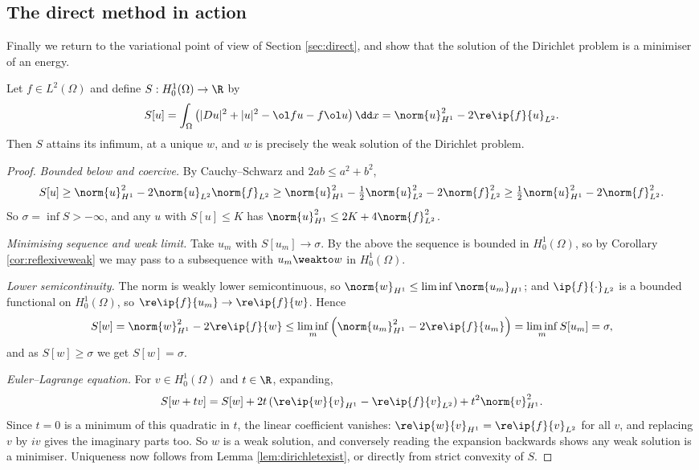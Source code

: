 \subsection{The direct method in action}

Finally we return to the variational point of view of Section \ref{sec:direct}, and show that the solution of the Dirichlet problem is a minimiser of an energy.

\begin{proposition}\label{prop:dirichletmin}
	Let $f \in L^2(\Omega)$ and define $S : H_0^1(\Omega)\to\R$ by
	$$S[u]=\int_\Omega\left(|Du|^2+|u|^2-\ol fu-f\ol u\right)\dd x = \norm{u}^2_{H^1}-2\re\ip{f}{u}_{L^2}.$$
	Then $S$ attains its infimum, at a unique $w$, and $w$ is precisely the weak solution of the Dirichlet problem.
\end{proposition}

\begin{proof}
	\emph{Bounded below and coercive.} By Cauchy--Schwarz and $2ab \le a^2 + b^2$,
	$$S[u]\ge\norm{u}^2_{H^1}-2\norm{u}_{L^2}\norm{f}_{L^2}\ge\norm{u}^2_{H^1}-\tfrac12\norm{u}^2_{L^2}-2\norm{f}^2_{L^2}\ge\tfrac12\norm{u}^2_{H^1}-2\norm{f}^2_{L^2}.$$
	So $\sigma = \inf S > -\infty$, and any $u$ with $S[u]\le K$ has $\norm{u}^2_{H^1}\le2K+4\norm{f}^2_{L^2}$.

	\emph{Minimising sequence and weak limit.} Take $u_m$ with $S[u_m]\to\sigma$. By the above the sequence is bounded in $H_0^1(\Omega)$, so by Corollary \ref{cor:reflexiveweak} we may pass to a subsequence with $u_m\weakto w$ in $H_0^1(\Omega)$.

	\emph{Lower semicontinuity.} The norm is weakly lower semicontinuous, so $\norm{w}_{H^1}\le\liminf\norm{u_m}_{H^1}$; and $\ip{f}{\cdot}_{L^2}$ is a bounded functional on $H_0^1(\Omega)$, so $\re\ip{f}{u_m}\to\re\ip{f}{w}$. Hence
	$$S[w]=\norm{w}^2_{H^1}-2\re\ip{f}{w}\le\liminf_m\left(\norm{u_m}^2_{H^1}-2\re\ip{f}{u_m}\right)=\liminf_mS[u_m]=\sigma,$$
	and as $S[w]\ge\sigma$ we get $S[w]=\sigma$.

	\emph{Euler--Lagrange equation.} For $v \in H_0^1(\Omega)$ and $t \in \R$, expanding,
	$$S[w+tv]=S[w]+2t\left(\re\ip{w}{v}_{H^1}-\re\ip{f}{v}_{L^2}\right)+t^2\norm{v}^2_{H^1}.$$
	Since $t = 0$ is a minimum of this quadratic in $t$, the linear coefficient vanishes: $\re\ip{w}{v}_{H^1}=\re\ip{f}{v}_{L^2}$ for all $v$, and replacing $v$ by $iv$ gives the imaginary parts too. So $w$ is a weak solution, and conversely reading the expansion backwards shows any weak solution is a minimiser. Uniqueness now follows from Lemma \ref{lem:dirichletexist}, or directly from strict convexity of $S$.
\end{proof}

